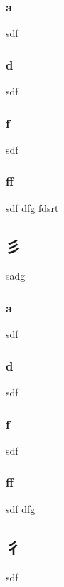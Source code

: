 \subsubsection{a}sdf
\subsubsection{d}sdf
\subsubsection{f}sdf
\subsubsection{ff}sdf
\setcounter{subsss}{\value{subsubsection}} dfg
fdsrt 
\subsection{\ene  彡} \label{cincuentaynueves} sadg

\subsubsection{a}sdf
\subsubsection{d}sdf
\subsubsection{f}sdf
\subsubsection{ff}sdf
\setcounter{subsss}{\value{subsubsection}} dfg
\subsection{\ene  彳} \label{sesentas}sdf
